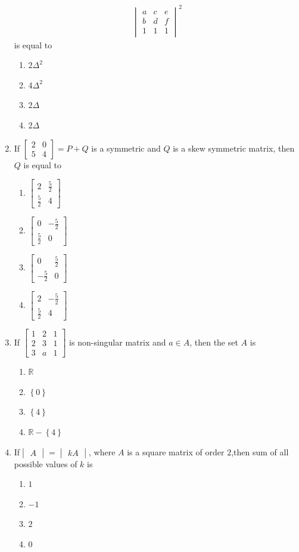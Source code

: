 \documentclass[12pt,-letter paper]{article}
\providecommand{\mydet}[1]{\ensuremath{\begin{vmatrix}#1\end{vmatrix}}}
\providecommand{\myvec}[1]{\ensuremath{\begin{bmatrix}#1\end{bmatrix}}}
\providecommand{\cbrak}[1]{\ensuremath{\left\{#1\right\}}}
\begin{document}
\begin{enumerate}
  \begin{align}
      \mydet{a & c & e\\b & d& f\\1&1&1}^2 
  \end{align}  
 is equal to
\begin{enumerate}[label=(\alph*)]
    \item 2$\Delta ^2$
    \item 4$\Delta ^2$ 
    \item 2$\Delta$
    \item 2$\Delta$
\end{enumerate}
    \item If $\myvec{2 & 0 \\5 & 4} = P + Q$ 
is a symmetric and $Q$ is a skew symmetric matrix, then $Q$ is equal to
\begin{enumerate}[label=(\alph*)]
    \item $\myvec{2  & \frac{5}{2} \\\frac{5}{2} & 4 }$
    \item $\myvec{ 0 & -\frac{5}{2} \\\frac{5}{2} & 0}$
    \item $\myvec{ 0 & \frac{5}{2} \\-\frac{5}{2} & 0}$
    \item $\myvec{2 & -\frac{5}{2} \\\frac{5}{2} & 4 }$
\end{enumerate}
\item If $\myvec{1 & 2 & 1 \\2 & 3 & 1 \\3 & a & 1}$
is non-singular matrix and  $a \in A $, then the set $A$ is 
\begin{enumerate}[label=(\alph*)]
    \item $\mathbb{R}$
    \item $\cbrak{0}$
    \item $\cbrak{4}$
    \item $\mathbb{R}-\cbrak{4}$
\end{enumerate}
\item If$\mydet{A} = \mydet{ kA}$, where $A$ is a square matrix of order $2$,then sum of all possible values of $k$ is
\begin{enumerate}[label=(\alph*)]
    \item $1$
    \item $-1$
    \item $2$
    \item $0$
\end{enumerate}

\end{enumerate}
\end{document}
